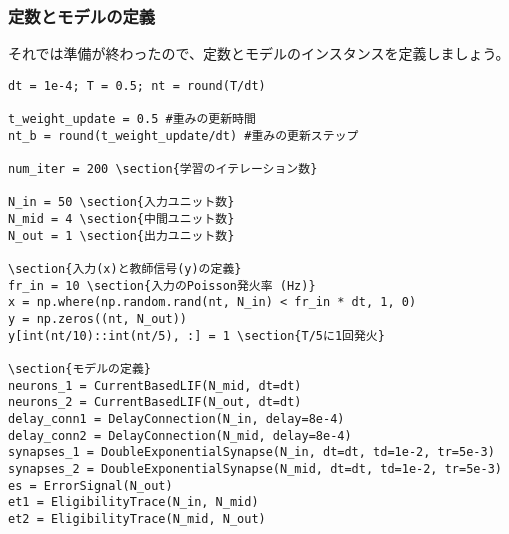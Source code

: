 \subsubsection{定数とモデルの定義}
それでは準備が終わったので、定数とモデルのインスタンスを定義しましょう。
\begin{verbatim}
dt = 1e-4; T = 0.5; nt = round(T/dt)

t_weight_update = 0.5 #重みの更新時間
nt_b = round(t_weight_update/dt) #重みの更新ステップ

num_iter = 200 \section{学習のイテレーション数}

N_in = 50 \section{入力ユニット数}
N_mid = 4 \section{中間ユニット数}
N_out = 1 \section{出力ユニット数}

\section{入力(x)と教師信号(y)の定義}
fr_in = 10 \section{入力のPoisson発火率 (Hz)}
x = np.where(np.random.rand(nt, N_in) < fr_in * dt, 1, 0)
y = np.zeros((nt, N_out)) 
y[int(nt/10)::int(nt/5), :] = 1 \section{T/5に1回発火}

\section{モデルの定義}
neurons_1 = CurrentBasedLIF(N_mid, dt=dt)
neurons_2 = CurrentBasedLIF(N_out, dt=dt)
delay_conn1 = DelayConnection(N_in, delay=8e-4)
delay_conn2 = DelayConnection(N_mid, delay=8e-4)
synapses_1 = DoubleExponentialSynapse(N_in, dt=dt, td=1e-2, tr=5e-3)
synapses_2 = DoubleExponentialSynapse(N_mid, dt=dt, td=1e-2, tr=5e-3)
es = ErrorSignal(N_out)
et1 = EligibilityTrace(N_in, N_mid)
et2 = EligibilityTrace(N_mid, N_out)


\end{verbatim}
